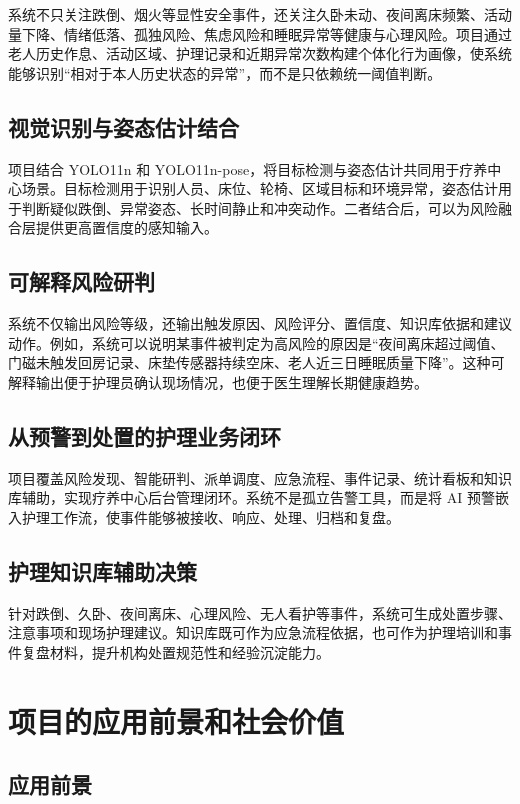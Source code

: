 \documentclass[UTF8,a4paper,zihao=-4,fontset=fandol]{ctexart}
\begin{document}
系统不只关注跌倒、烟火等显性安全事件，还关注久卧未动、夜间离床频繁、活动量下降、情绪低落、孤独风险、焦虑风险和睡眠异常等健康与心理风险。项目通过老人历史作息、活动区域、护理记录和近期异常次数构建个体化行为画像，使系统能够识别“相对于本人历史状态的异常”，而不是只依赖统一阈值判断。

\subsection{视觉识别与姿态估计结合}

项目结合 YOLO11n 和 YOLO11n-pose，将目标检测与姿态估计共同用于疗养中心场景。目标检测用于识别人员、床位、轮椅、区域目标和环境异常，姿态估计用于判断疑似跌倒、异常姿态、长时间静止和冲突动作。二者结合后，可以为风险融合层提供更高置信度的感知输入。

\subsection{可解释风险研判}

系统不仅输出风险等级，还输出触发原因、风险评分、置信度、知识库依据和建议动作。例如，系统可以说明某事件被判定为高风险的原因是“夜间离床超过阈值、门磁未触发回房记录、床垫传感器持续空床、老人近三日睡眠质量下降”。这种可解释输出便于护理员确认现场情况，也便于医生理解长期健康趋势。

\subsection{从预警到处置的护理业务闭环}

项目覆盖风险发现、智能研判、派单调度、应急流程、事件记录、统计看板和知识库辅助，实现疗养中心后台管理闭环。系统不是孤立告警工具，而是将 AI 预警嵌入护理工作流，使事件能够被接收、响应、处理、归档和复盘。

\subsection{护理知识库辅助决策}

针对跌倒、久卧、夜间离床、心理风险、无人看护等事件，系统可生成处置步骤、注意事项和现场护理建议。知识库既可作为应急流程依据，也可作为护理培训和事件复盘材料，提升机构处置规范性和经验沉淀能力。

\section{项目的应用前景和社会价值}

\subsection{应用前景}
\end{document}
